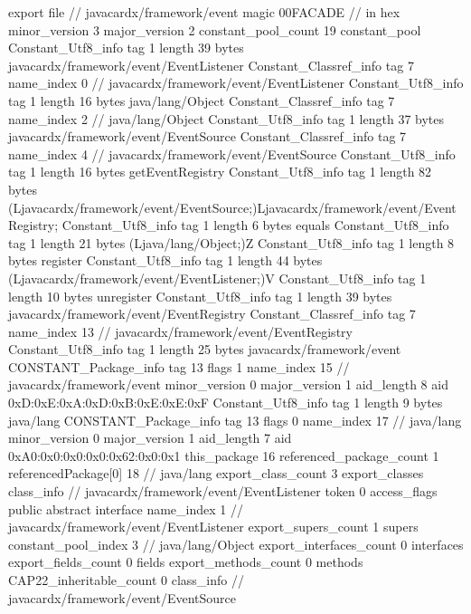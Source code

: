 export file {		// javacardx/framework/event
	magic	00FACADE		 // in hex
	minor_version	3
	major_version	2
	constant_pool_count	19
	constant_pool {
		Constant_Utf8_info {
			tag	1
			length	39
			bytes	javacardx/framework/event/EventListener
		}
		Constant_Classref_info {
			tag	7
			name_index	0		// javacardx/framework/event/EventListener
		}
		Constant_Utf8_info {
			tag	1
			length	16
			bytes	java/lang/Object
		}
		Constant_Classref_info {
			tag	7
			name_index	2		// java/lang/Object
		}
		Constant_Utf8_info {
			tag	1
			length	37
			bytes	javacardx/framework/event/EventSource
		}
		Constant_Classref_info {
			tag	7
			name_index	4		// javacardx/framework/event/EventSource
		}
		Constant_Utf8_info {
			tag	1
			length	16
			bytes	getEventRegistry
		}
		Constant_Utf8_info {
			tag	1
			length	82
			bytes	(Ljavacardx/framework/event/EventSource;)Ljavacardx/framework/event/EventRegistry;
		}
		Constant_Utf8_info {
			tag	1
			length	6
			bytes	equals
		}
		Constant_Utf8_info {
			tag	1
			length	21
			bytes	(Ljava/lang/Object;)Z
		}
		Constant_Utf8_info {
			tag	1
			length	8
			bytes	register
		}
		Constant_Utf8_info {
			tag	1
			length	44
			bytes	(Ljavacardx/framework/event/EventListener;)V
		}
		Constant_Utf8_info {
			tag	1
			length	10
			bytes	unregister
		}
		Constant_Utf8_info {
			tag	1
			length	39
			bytes	javacardx/framework/event/EventRegistry
		}
		Constant_Classref_info {
			tag	7
			name_index	13		// javacardx/framework/event/EventRegistry
		}
		Constant_Utf8_info {
			tag	1
			length	25
			bytes	javacardx/framework/event
		}
		CONSTANT_Package_info {
			tag	13
			flags	1
			name_index	15		// javacardx/framework/event
			minor_version	0
			major_version	1
			aid_length	8
			aid	0xD:0xE:0xA:0xD:0xB:0xE:0xE:0xF
		}
		Constant_Utf8_info {
			tag	1
			length	9
			bytes	java/lang
		}
		CONSTANT_Package_info {
			tag	13
			flags	0
			name_index	17		// java/lang
			minor_version	0
			major_version	1
			aid_length	7
			aid	0xA0:0x0:0x0:0x0:0x62:0x0:0x1
		}
	}
	this_package	16
	referenced_package_count	1
	referencedPackage[0]	18		// java/lang
	export_class_count	3
	export_classes {
		class_info {		// javacardx/framework/event/EventListener
			token	0
			access_flags	public abstract interface
			name_index	1		// javacardx/framework/event/EventListener
			export_supers_count	1
			supers {
				constant_pool_index	3		// java/lang/Object
			}
			export_interfaces_count	0
			interfaces {
			}
			export_fields_count	0
			fields {
			}
			export_methods_count	0
			methods {
			}
			CAP22_inheritable_count	0
		}
		class_info {		// javacardx/framework/event/EventSource
}}}
